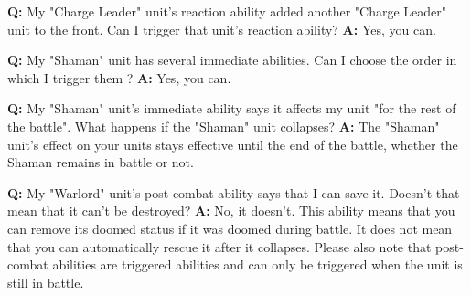 \documentclass[a4paper]{article}
\begin{document}
    \hspace{-2em}
    \textbf{Q:} My "Charge Leader" unit's reaction ability added another
    "Charge Leader" unit to the front. Can I trigger that unit's reaction ability?
    \newline
    \textbf{A:} Yes, you can.
    
    \hspace{-2em}
    \textbf{Q:} My "Shaman" unit has several immediate abilities. Can I choose the order
    in which I trigger them ?
    \newline
    \textbf{A:} Yes, you can.
    
    \hspace{-2em}
    \textbf{Q:} My "Shaman" unit's immediate ability says it affects my unit "for the
    rest of the battle". What happens if the "Shaman" unit collapses?
    \newline
    \textbf{A:} The "Shaman" unit's effect on your units stays effective until
    the end of the battle, whether the Shaman remains in battle or not.
    
    \hspace{-2em}
    \textbf{Q:} My "Warlord" unit's post-combat ability says that I can save it.
    Doesn't that mean that it can't be destroyed?
    \newline
    \textbf{A:} No, it doesn't. This ability means that you can remove its doomed status
    if it was doomed during battle.
    It does not mean that you can automatically rescue it after it collapses.
    Please also note that post-combat abilities are triggered abilities and can only
    be triggered when the unit is still in battle.
    
    
    
\end{document}
